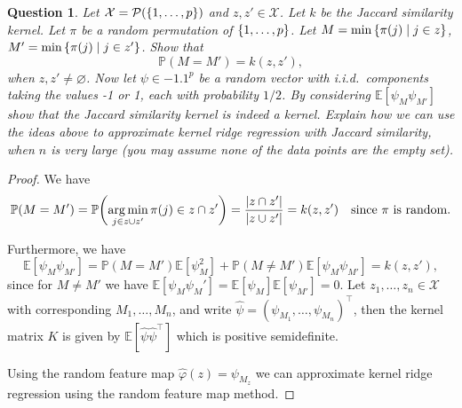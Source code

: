 \documentclass{article}
\theoremstyle{plain}
\newtheorem{question}{Question}
\theoremstyle{remark}
\renewcommand{\emptyset}{\varnothing}
\renewcommand{\phi}{\varphi}
\newcommand{\Bb}{\mathbb}
\newcommand{\Cal}{\mathcal}
\newcommand{\PP}{\Bb P}
\newcommand{\EE}{\Bb E}
\newcommand\XX{\Cal X}
\newcommand{\T}{^\top} %
\newcommand\pow{\Cal P} %
\DeclareMathOperator*{\argmin}{arg\,min}
\begin{document}
\begin{question}
	Let $\XX = \pow(\qty{1, \dotsc, p})$ and $z, z' \in \XX$. Let $k$ be the Jaccard similarity kernel. Let $\pi$ be a random permutation of $\qty{1, \dotsc, p}$. Let $M = \min\qty{\pi(j) \mid j \in z}$, $M' = \min\qty{\pi(j) \mid j \in z'}$. Show that
	\[
	\PP(M = M') = k(z, z'),
	\]
	when $z, z' \neq \emptyset$. Now let $\psi \in \qty{-1, 1}^p$ be a random vector with i.i.d.\ components taking the values -1 or 1, each with probability $1/2$. By considering $\EE[\psi_M\psi_{M'}]$ show that the Jaccard similarity kernel is indeed a kernel. Explain how we can use the ideas above to approximate kernel ridge regression with Jaccard similarity, when $n$ is very large (you may assume none of the data points are the empty set). 
\end{question}

\begin{proof}
	We have \[
	\PP(M = M') = \PP\qty(\argmin_{j \in z \cup z'} \pi(j) \in z \cap z') = \frac{\abs{z \cap z'}}{\abs{z \cup z'}} = k(z, z') \quad\text{since $\pi$ is random.}
	\]
	
	Furthermore, we have
	\[
	\EE[\psi_M \psi_{M'}] = \PP(M = M') \EE[\psi_M^2] + \PP(M \neq M') \EE[\psi_M \psi_{M'}] = k(z, z'), 
	\]
	since for $M \neq M'$ we have $\EE[\psi_M\psi_M'] = \EE[\psi_M]\EE[\psi_{M'}] = 0$. 
	Let $z_1, \dotsc, z_n \in \XX$ with corresponding $M_1, \dotsc, M_n$, and write $\hat \psi = (\psi_{M_1}, \dotsc, \psi_{M_n})\T$, then the kernel matrix $K$ is given by $\EE[\hat\psi \hat\psi\T]$ which is positive semidefinite. 
	
	Using the random feature map $\hat\phi(z) = \psi_{M_z}$ we can approximate kernel ridge regression using the random feature map method. 
\end{proof}
\end{document}
